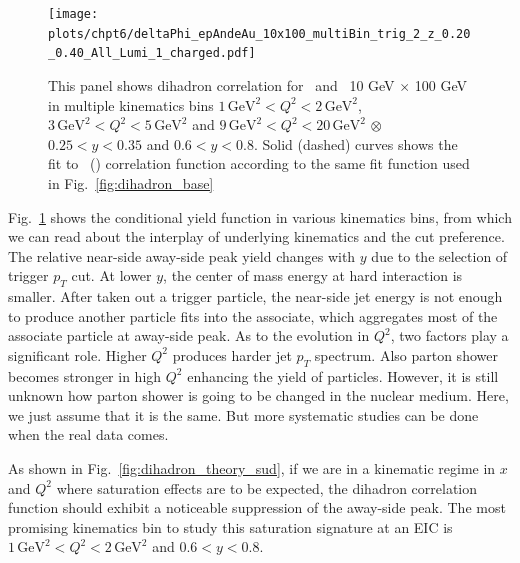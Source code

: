 \begin{figure}
\begin{center}
\texttt{[image: plots/chpt6/deltaPhi\_epAndeAu\_10x100\_multiBin\_trig\_2\_z\_0.20\_0.40\_All\_Lumi\_1\_charged.pdf]}
\end{center} 
\caption[Dihadron correlation function in multiple kinematic bins]{This panel shows dihadron correlation for \ep\ and \eAu\ 10 GeV $\times$ 100 GeV in multiple kinematics bins $1\, \textrm{GeV}^{2}<Q^{2}<2 \, \mathrm{GeV}^{2}$, $3\, \textrm{GeV}^{2}<Q^{2}<5 \,
\mathrm{GeV}^{2}$ and $9\, \textrm{GeV}^{2}<Q^{2}<20 \, \mathrm{GeV}^{2}$ $\otimes $
$0.25<y<0.35$ and $0.6<y<0.8$. Solid (dashed) curves shows the fit to
\ep\ (\eAu) correlation function according to the same fit function used in Fig.~\ref{fig:dihadron_base}}
\label{fig:dihadronMulti} 
\end{figure}

Fig.~\ref{fig:dihadronMulti} shows the conditional yield function in various
kinematics bins, from which we can read about the interplay of
underlying kinematics and the cut preference. The relative near-side away-side
peak yield changes with $y$ due to the selection of trigger $p_{T}$ cut. At
lower $y$, the center of mass energy at hard interaction is smaller. After taken
out a trigger particle, the near-side jet energy is not enough to produce
another particle fits into the associate, which aggregates most of the associate
particle at away-side peak. As to the evolution in $Q^{2}$, two factors play a
significant role. Higher $Q^{2}$ produces harder jet $p_{T}$ spectrum. Also
parton shower becomes stronger in high $Q^{2}$ enhancing the yield of particles.
However, it is still unknown how parton shower is going to be changed in the nuclear
medium. Here, we just assume that it is the same. But more systematic
studies can be done when the real data comes.


As shown in Fig.~\ref{fig:dihadron_theory_sud}, if we are in a kinematic regime
in $x$ and $Q^2$ where saturation effects are to be expected, the dihadron
correlation function should exhibit a noticeable suppression of the away-side
peak. The most promising kinematics bin to study this saturation signature at an
EIC is $1\, \textrm{GeV}^{2}<Q^{2}<2 \, \mathrm{GeV}^{2}$ and $0.6<y<0.8$.

